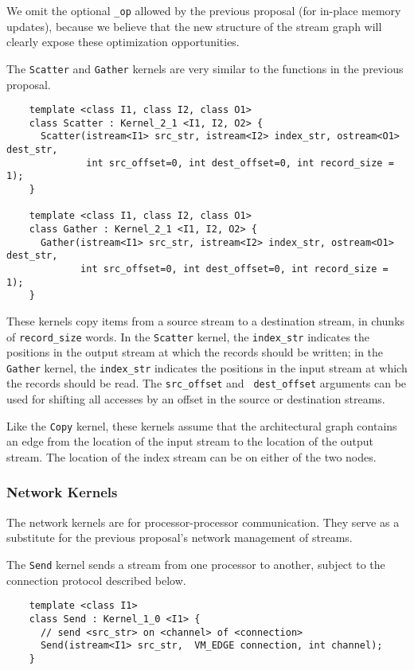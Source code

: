 We omit the optional {\tt \_op} allowed by the previous proposal (for
in-place memory updates), because we believe that the new structure of
the stream graph will clearly expose these optimization opportunities.

 The {\tt Scatter} and {\tt Gather} kernels are
very similar to the functions in the previous proposal.
{\small
\begin{verbatim}
    template <class I1, class I2, class O1>
    class Scatter : Kernel_2_1 <I1, I2, O2> {
      Scatter(istream<I1> src_str, istream<I2> index_str, ostream<O1> dest_str, 
              int src_offset=0, int dest_offset=0, int record_size = 1);
    }

    template <class I1, class I2, class O1>
    class Gather : Kernel_2_1 <I1, I2, O2> {
      Gather(istream<I1> src_str, istream<I2> index_str, ostream<O1> dest_str, 
             int src_offset=0, int dest_offset=0, int record_size = 1);
    }  
\end{verbatim}}

These kernels copy items from a source stream to a destination stream,
in chunks of {\tt record\_size} words.  In the {\tt Scatter} kernel,
the {\tt index\_str} indicates the positions in the output stream at
which the records should be written; in the {\tt Gather} kernel, the
{\tt index\_str} indicates the positions in the input stream at which
the records should be read.  The {\tt src\_offset} and {\tt
dest\_offset} arguments can be used for shifting all accesses by an
offset in the source or destination streams.

Like the {\tt Copy} kernel, these kernels assume that the
architectural graph contains an edge from the location of the input
stream to the location of the output stream.  The location of the
index stream can be on either of the two nodes.

\subsubsection*{Network Kernels}

The network kernels are for processor-processor communication.  They
serve as a substitute for the previous proposal's network management
of streams.

 The {\tt Send} kernel sends a stream from one processor to
another, subject to the connection protocol described below.
{\small
\begin{verbatim}
    template <class I1>
    class Send : Kernel_1_0 <I1> {
      // send <src_str> on <channel> of <connection>
      Send(istream<I1> src_str,  VM_EDGE connection, int channel);
    }
\end{verbatim}}

